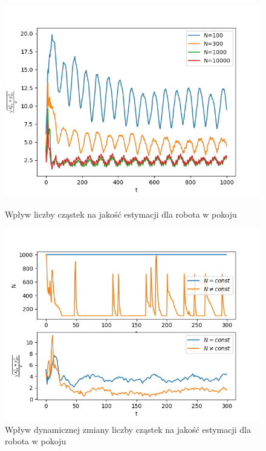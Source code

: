 \begin{figure}[H]
	\begin{center}
		\includegraphics[width=12cm]{./wplyw_N.png}
		\caption{Wpływ liczby cząstek na jakość estymacji dla robota w pokoju}
		\label{wplyw_N}
	\end{center}

	\begin{center}
		\includegraphics[width=12cm]{./dynamic_N.png}
		\caption{Wpływ dynamicznej zmiany liczby cząstek na jakość estymacji dla robota w pokoju}
		\label{dynamic_N}
	\end{center}
\end{figure}


